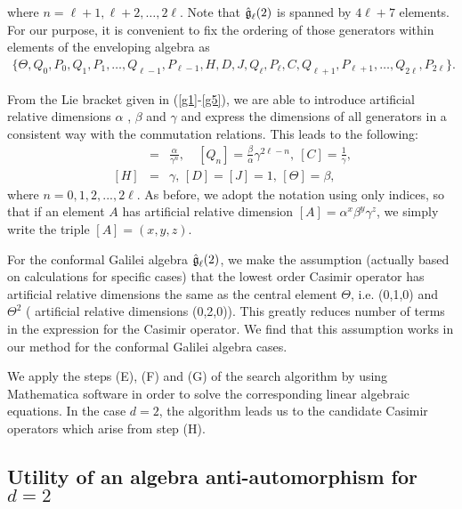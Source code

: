 \documentclass[12pt]{article}
\begin{document}
 where  $n=\ell+ 1,\ell+2, \ldots,2\ell$.
Note that $\mathfrak{\Hat{g}}_\ell(2)$ is spanned by  $4\ell +7$ elements. For
our purpose, it is convenient to fix the ordering of those generators within
elements of the enveloping algebra as
\begin{eqnarray}
\{ \Theta , Q_{0},P_{0},Q_{1},P_{1}, \ldots, Q_{\ell- 1},P_{\ell- 1}, H,D,J,
	Q_{\ell},P_{\ell},C, Q_{\ell+ 1},P_{\ell+ 1}, \ldots, Q_{2\ell},P_{2\ell} \}. \label{fd2}
\end{eqnarray}

From the Lie bracket given in (\ref{g1}-\ref{g5}), we are able to introduce
artificial relative dimensions $\alpha$ , $\beta$ and $\gamma$ and express the
dimensions of all generators in a consistent way with the commutation
relations. This leads to the following:
\begin{eqnarray}
[P_ {n}]&=& \frac{\alpha}{\gamma^{n}},\quad [Q_ {n}]= \frac{\beta}{\alpha} \gamma^{2 \ell - n},\ [C]=\frac{1}{\gamma},  \nonumber 
\\
 \,  [H]&=&\gamma, \, [D]=[J]=1, \,  [\Theta ]=\beta, \label{th155} 
\end{eqnarray} 
where $n = 0,1, 2, . . . , 2\ell$. As before, we adopt the notation using only
indices, so that if an element $A$ has artificial relative dimension
$[A]=\alpha^x\beta^y\gamma^z$, we simply write the triple $[A]=(x,y,z)$.

For  the conformal Galilei algebra $\mathfrak{\Hat{g}}_\ell(2)$, we make the
assumption (actually based on calculations for specific cases) that the lowest order Casimir operator has artificial relative
dimensions the same as the central element $\Theta$, i.e. (0,1,0) and $\Theta^2$
( artificial relative dimensions (0,2,0)). This greatly reduces number of terms
in the expression for the Casimir operator. We find that this assumption works
in our method for the conformal Galilei algebra cases.

We apply the steps (E), (F) and (G) of the search algorithm by using
Mathematica software in order to solve the corresponding linear algebraic equations. In the
case $d=2$, the algorithm leads us to the candidate Casimir operators which
arise from step (H).

\subsection{Utility of an algebra anti-automorphism for  $d=2$ }
\end{document}
